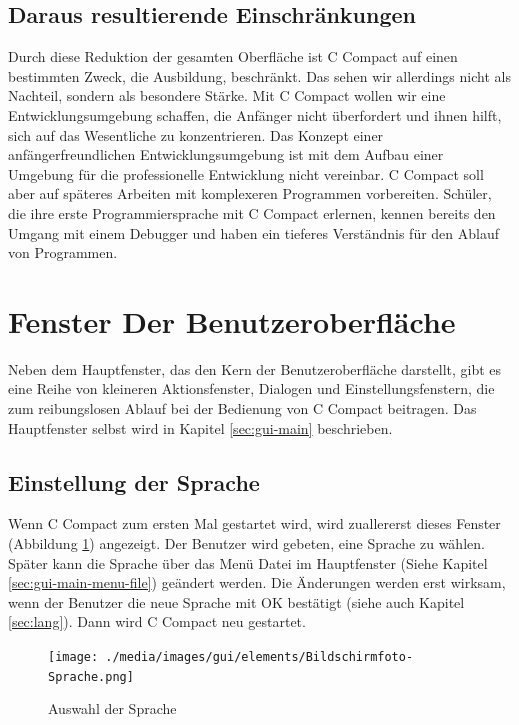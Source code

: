 \subsection{Daraus resultierende Einschränkungen}
Durch diese Reduktion der gesamten Oberfläche ist C Compact auf einen bestimmten Zweck, die Ausbildung, beschränkt. Das sehen wir allerdings nicht als Nachteil, sondern als besondere Stärke. Mit C Compact wollen wir eine Entwicklungsumgebung schaffen, die Anfänger nicht überfordert und ihnen hilft, sich auf das Wesentliche zu konzentrieren.
Das Konzept einer anfängerfreundlichen Entwicklungsumgebung ist mit dem Aufbau einer Umgebung für die professionelle Entwicklung nicht vereinbar. C Compact soll aber auf späteres Arbeiten mit komplexeren Programmen vorbereiten. Schüler, die ihre erste Programmiersprache mit C Compact erlernen, kennen bereits den Umgang mit einem Debugger und haben ein tieferes Verständnis für den Ablauf von Programmen.

\section{Fenster Der Benutzeroberfläche}
Neben dem Hauptfenster, das den Kern der Benutzeroberfläche darstellt, gibt es eine Reihe von kleineren Aktionsfenster, Dialogen und Einstellungsfenstern, die zum reibungslosen Ablauf bei der Bedienung von C Compact beitragen. Das Hauptfenster selbst wird in Kapitel \ref{sec:gui-main} beschrieben.



\subsection{Einstellung der Sprache}
\label{sec:win-lang}
Wenn C Compact zum ersten Mal gestartet wird, wird zuallererst dieses Fenster (Abbildung \ref{fig:win-lang}) angezeigt. Der Benutzer wird gebeten, eine Sprache zu wählen. Später kann die Sprache über das Menü \glqq{}Datei\grqq{} im Hauptfenster (Siehe Kapitel \ref{sec:gui-main-menu-file}) geändert werden. Die Änderungen werden erst wirksam, wenn der Benutzer die neue Sprache mit \glqq{}OK\grqq{} bestätigt (siehe auch Kapitel \ref{sec:lang}). Dann wird C Compact neu gestartet.

\begin{figure}[htp]
\centering
\texttt{[image: ./media/images/gui/elements/Bildschirmfoto-Sprache.png]}
\caption{Auswahl der Sprache}
\label{fig:win-lang}
\end{figure}

